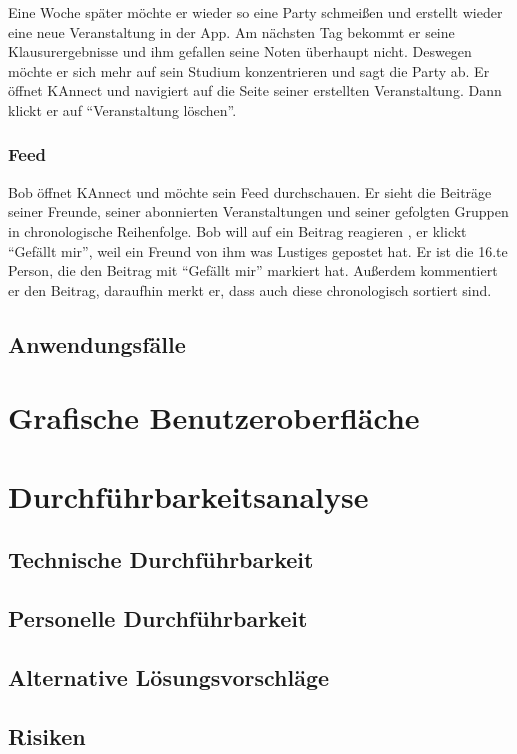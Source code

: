 \documentclass[parskip=full]{scrartcl}
\begin{document}
	Eine Woche später möchte er wieder so eine Party schmeißen und erstellt wieder eine neue Veranstaltung in der App. Am nächsten Tag bekommt er seine Klausurergebnisse und ihm gefallen seine Noten überhaupt nicht. Deswegen möchte er sich mehr auf sein Studium konzentrieren und sagt die Party ab. Er öffnet KAnnect und navigiert auf die Seite seiner erstellten Veranstaltung. Dann klickt er auf “Veranstaltung löschen”.

	\subsubsection{Feed}
	Bob öffnet KAnnect und möchte sein Feed durchschauen. Er sieht die Beiträge seiner Freunde, seiner abonnierten Veranstaltungen und seiner gefolgten Gruppen in chronologische Reihenfolge.
	Bob will auf ein Beitrag reagieren , er klickt “Gefällt mir”, weil ein Freund von ihm was Lustiges gepostet hat. Er ist die 16.te Person, die den Beitrag mit “Gefällt mir” markiert hat. Außerdem kommentiert er den Beitrag, daraufhin merkt er, dass auch diese chronologisch sortiert sind.

	\subsection{Anwendungsfälle}

	\section{Grafische Benutzeroberfläche}

	\section{Durchführbarkeitsanalyse}

	\subsection{Technische Durchführbarkeit}
	\subsection{Personelle Durchführbarkeit}
	\subsection{Alternative Lösungsvorschläge}
	\subsection{Risiken}
\end{document}
